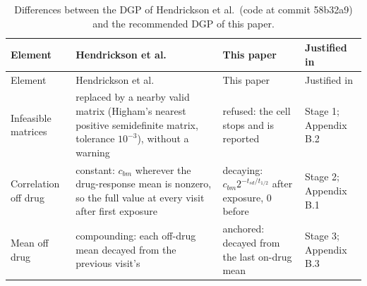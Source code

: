 \documentclass[
  11pt,
]{article}
\begin{document}
\begin{longtable}[]{@{}
  >{\raggedright\arraybackslash}p{}
  >{\raggedright\arraybackslash}p{}
  >{\raggedright\arraybackslash}p{}
  >{\raggedright\arraybackslash}p{}@{}}
\caption{\label{tab:diffs} Differences between the DGP of Hendrickson et al.~(code at commit 58b32a9) and the recommended DGP of this paper.}\tabularnewline
\toprule\noalign{}
\begin{minipage}[b]{\linewidth}\raggedright
Element
\end{minipage} & \begin{minipage}[b]{\linewidth}\raggedright
Hendrickson et al.
\end{minipage} & \begin{minipage}[b]{\linewidth}\raggedright
This paper
\end{minipage} & \begin{minipage}[b]{\linewidth}\raggedright
Justified in
\end{minipage} \\
\midrule\noalign{}
\endfirsthead
\toprule\noalign{}
\begin{minipage}[b]{\linewidth}\raggedright
Element
\end{minipage} & \begin{minipage}[b]{\linewidth}\raggedright
Hendrickson et al.
\end{minipage} & \begin{minipage}[b]{\linewidth}\raggedright
This paper
\end{minipage} & \begin{minipage}[b]{\linewidth}\raggedright
Justified in
\end{minipage} \\
\midrule\noalign{}
\endhead
\bottomrule\noalign{}
\endlastfoot
Infeasible matrices & replaced by a nearby valid matrix (Higham's nearest positive semidefinite matrix, tolerance \(10^{-3}\)), without a warning & refused: the cell stops and is reported & Stage 1; Appendix B.2 \\
Correlation off drug & constant: \(c_{bm}\) wherever the drug-response mean is nonzero, so the full value at every visit after first exposure & decaying: \(c_{bm}2^{-t_{sd}/t_{1/2}}\) after exposure, 0 before & Stage 2; Appendix B.1 \\
Mean off drug & compounding: each off-drug mean decayed from the previous visit's & anchored: decayed from the last on-drug mean & Stage 3; Appendix B.3 \\

\end{longtable}
\end{document}
